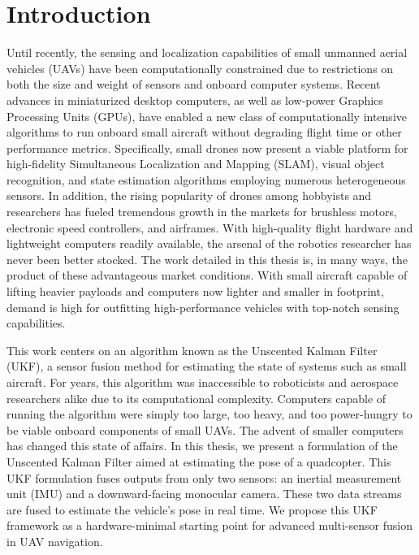 \chapter{Introduction}

Until recently, the sensing and localization capabilities of small unmanned aerial vehicles (UAVs) have been computationally constrained due to restrictions on both the size and weight of sensors and onboard computer systems. Recent advances in miniaturized desktop computers, as well as low-power Graphics Processing Units (GPUs), have enabled a new class of computationally intensive algorithms to run onboard small aircraft without degrading flight time or other performance metrics. Specifically, small drones now present a viable platform for high-fidelity Simultaneous Localization and Mapping (SLAM), visual object recognition, and state estimation algorithms employing numerous heterogeneous sensors. In addition, the rising popularity of drones among hobbyists and researchers has fueled tremendous growth in the markets for brushless motors, electronic speed controllers, and airframes. With high-quality flight hardware and lightweight computers readily available, the arsenal of the robotics researcher has never been better stocked. The work detailed in this thesis is, in many ways, the product of these advantageous market conditions. With small aircraft capable of lifting heavier payloads and computers now lighter and smaller in footprint, demand is high for outfitting high-performance vehicles with top-notch sensing capabilities.

This work centers on an algorithm known as the Unscented Kalman Filter (UKF), a sensor fusion method for estimating the state of systems such as small aircraft. For years, this algorithm was inaccessible to roboticists and aerospace researchers alike due to its computational complexity. Computers capable of running the algorithm were simply too large, too heavy, and too power-hungry to be viable onboard components of small UAVs. The advent of smaller computers has changed this state of affairs. In this thesis, we present a formulation of the Unscented Kalman Filter aimed at estimating the pose of a quadcopter. This UKF formulation fuses outputs from only two sensors: an inertial measurement unit (IMU) and a downward-facing monocular camera. These two data streams are fused to estimate the vehicle's pose in real time. We propose this UKF framework as a hardware-minimal starting point for advanced multi-sensor fusion in UAV navigation.

